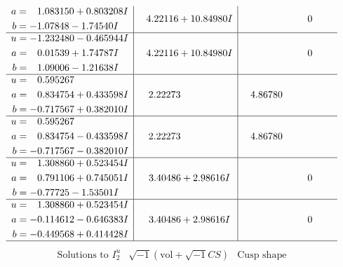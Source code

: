 \documentclass[1p]{elsarticle_modified}
\theoremstyle{definition}
\newcommand{\I}{\sqrt{-1}}
\begin{document}
$$\begin{array}{c|c|c}
\begin{aligned}
a &= \phantom{-}1.083150 + 0.803208 I \\
b &= -1.07848 - 1.74540 I\end{aligned}
 & \phantom{-}4.22116 + 10.84980 I & \phantom{-0.000000 } 0 \\ \hline\begin{aligned}
u &= -1.232480 - 0.465944 I \\
a &= \phantom{-}0.01539 + 1.74787 I \\
b &= \phantom{-}1.09006 - 1.21638 I\end{aligned}
 & \phantom{-}4.22116 + 10.84980 I & \phantom{-0.000000 } 0 \\ \hline\begin{aligned}
u &= \phantom{-}0.595267\phantom{ +0.000000I} \\
a &= \phantom{-}0.834754 + 0.433598 I \\
b &= -0.717567 + 0.382010 I\end{aligned}
 & \phantom{-}2.22273\phantom{ +0.000000I} & \phantom{-}4.86780\phantom{ +0.000000I} \\ \hline\begin{aligned}
u &= \phantom{-}0.595267\phantom{ +0.000000I} \\
a &= \phantom{-}0.834754 - 0.433598 I \\
b &= -0.717567 - 0.382010 I\end{aligned}
 & \phantom{-}2.22273\phantom{ +0.000000I} & \phantom{-}4.86780\phantom{ +0.000000I} \\ \hline\begin{aligned}
u &= \phantom{-}1.308860 + 0.523454 I \\
a &= \phantom{-}0.791106 + 0.745051 I \\
b &= -0.77725 - 1.53501 I\end{aligned}
 & \phantom{-}3.40486 + 2.98616 I & \phantom{-0.000000 } 0 \\ \hline\begin{aligned}
u &= \phantom{-}1.308860 + 0.523454 I \\
a &= -0.114612 - 0.646383 I \\
b &= -0.449568 + 0.414428 I\end{aligned}
 & \phantom{-}3.40486 + 2.98616 I & \phantom{-0.000000 } 0\\
 \hline 
 \end{array}$$\newpage$$\begin{array}{c|c|c}  
\text{Solutions to }I^u_{2}& \I (\text{vol} + \sqrt{-1}CS) & \text{Cusp shape}\\

\end{array}$$
\end{document}
